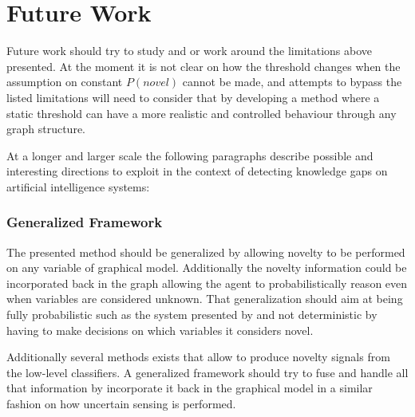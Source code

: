 \section{Future Work}

Future work should try to study and or work around the limitations above presented. At the moment
it is not clear on how the threshold changes when the assumption on constant $P(novel)$ cannot be
made, and attempts to bypass the listed limitations will need to consider that by developing a
method where a static threshold can have a more realistic and controlled behaviour through any graph
structure.

At a longer and larger scale the following paragraphs describe possible and interesting directions
to exploit in the context of detecting knowledge gaps on artificial intelligence systems:


\subsubsection*{Generalized Framework}
The presented method should be generalized by allowing novelty to be performed on any variable of
graphical model. Additionally the novelty information could be incorporated back in the graph
allowing the agent to probabilistically reason even when variables are considered unknown.
That generalization should aim at being fully probabilistic such as the system presented by
\cite{ranganathan2010pliss} and not deterministic by having to make decisions on which variables
it considers novel.

Additionally several methods exists that allow to produce novelty signals from the low-level
classifiers. A generalized framework should try to fuse and handle all that information by
incorporate it back in the graphical model in a similar fashion on how uncertain sensing is
performed.

